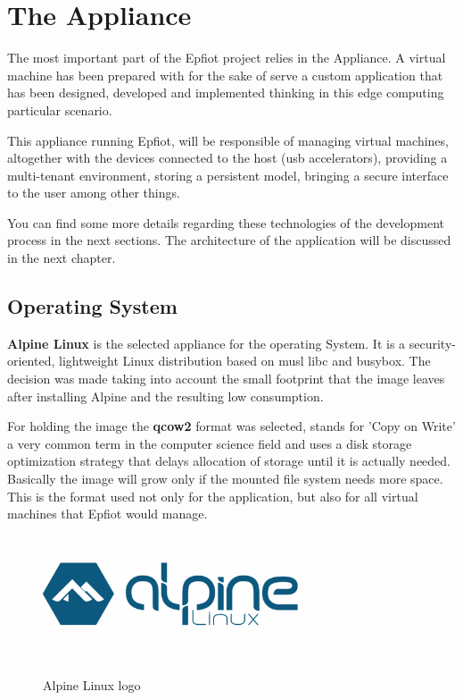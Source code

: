 \section{The Appliance}
\label{makereference3.2}
The most important part of the Epfiot project relies in the Appliance. A virtual machine has been prepared with for the sake of serve a custom application that has been designed, developed and implemented thinking in this edge computing particular scenario.

This appliance running Epfiot, will be responsible of managing virtual machines, altogether with the devices connected to the host (usb accelerators), providing a multi-tenant environment, storing a persistent model, bringing a secure interface to the user among other things.

You can find some more details regarding these technologies of the development process in the next sections. The architecture of the application will be discussed in the next chapter.

\subsection{Operating System}
\label{makereference3.2.1}
\textbf{Alpine Linux} is the selected appliance for the operating System. It is a security-oriented, lightweight Linux distribution based on musl libc and busybox.
The decision was made taking into account the small footprint that the image leaves after installing Alpine and the resulting low consumption. 

For holding the image the \textbf{qcow2} format was selected, stands for 'Copy on Write' a very common term in the computer science field and uses a disk storage optimization strategy that delays allocation of storage until it is actually needed. Basically the image will grow only if the mounted file system needs more space. This is the format used not only for the application, but also for all virtual machines that Epfiot would manage.

\begin{figure}[h!]%
\centering
    \includegraphics[width=3in]{figures/alpine.png}
~\caption{Alpine Linux logo}
\label{figure3.3}
\end{figure}
\newpage


